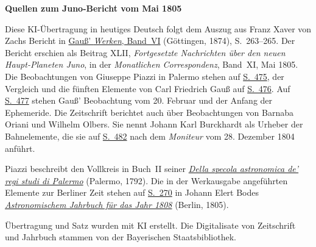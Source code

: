 \clearpage\thispagestyle{empty}
\begin{center}\textbf{Quellen zum Juno-Bericht vom Mai 1805}\end{center}
\noindent Diese KI-Übertragung in heutiges Deutsch folgt dem Auszug aus Franz Xaver von Zachs Bericht in \href{https://gdz.sub.uni-goettingen.de/id/PPN236007467}{Gauß’ \textit{Werken}, Band~VI} (Göttingen, 1874), S.~263--265. Der Bericht erschien als Beitrag XLII, \textit{Fortgesetzte Nachrichten über den neuen Haupt-Planeten Juno}, in der \textit{Monatlichen Correspondenz}, Band~XI, Mai 1805. Die Beobachtungen von Giuseppe Piazzi in Palermo stehen auf \href{https://www.digitale-sammlungen.de/en/view/bsb10538603?page=489}{S.~475}, der Vergleich und die fünften Elemente von Carl Friedrich Gauß auf \href{https://www.digitale-sammlungen.de/en/view/bsb10538603?page=490}{S.~476}. Auf \href{https://www.digitale-sammlungen.de/en/view/bsb10538603?page=491}{S.~477} stehen Gauß’ Beobachtung vom 20. Februar und der Anfang der Ephemeride. Die Zeitschrift berichtet auch über Beobachtungen von Barnaba Oriani und Wilhelm Olbers. Sie nennt Johann Karl Burckhardt als Urheber der Bahnelemente, die sie auf \href{https://www.digitale-sammlungen.de/en/view/bsb10538603?page=496}{S.~482} nach dem \textit{Moniteur} vom 28. Dezember 1804 anführt.
\par\smallskip\noindent Piazzi beschreibt den Vollkreis in Buch~II seiner \href{https://www.e-rara.ch/zut/content/titleinfo/11884975}{\textit{Della specola astronomica de’ regi studi di Palermo}} (Palermo, 1792). Die in der Werkausgabe angeführten Elemente zur Berliner Zeit stehen auf \href{https://www.digitale-sammlungen.de/en/view/bsb10538337?page=280}{S.~270} in Johann Elert Bodes \href{https://www.digitale-sammlungen.de/en/view/bsb10538337?page=7}{\textit{Astronomischem Jahrbuch für das Jahr 1808}} (Berlin, 1805).
\par\smallskip\noindent Übertragung und Satz wurden mit KI erstellt. Die Digitalisate von Zeitschrift und Jahrbuch stammen von der Bayerischen Staatsbibliothek.
\clearpage
